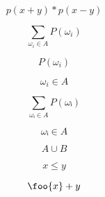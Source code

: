 \documentclass{article}
\begin{document}
\[
p(x+y) * p(x-y)
\]

\[
\sum_{\omega_i\in A} P(\omega_i)
\]

\[
P(\omega_i)
\]

\[
\omega_i\in A
\]

\[
∑_{ωᵢ∈A} P(ωᵢ)
\]

\[
ωᵢ∈A
\]

\[
A∪B
\]

\[
x≤y
\]

\[
\foo{x}+y
\]
\end{document}
